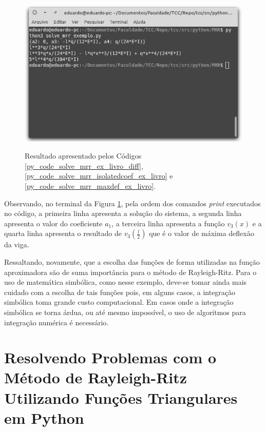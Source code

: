 \documentclass[
	12pt,				%
	openright,			%
    twoside,			%
	a4paper,			%
	english,			%
	french,				%
	spanish,			%
	brazil				%
	]{abntex2}
\numberwithin{lema}{chapter}
\numberwithin{teorema}{chapter}
\numberwithin{definicao}{chapter}
\numberwithin{exemplo}{chapter}
\numberwithin{figure}{chapter}
\begin{document}
\begin{figure}[h]
	\caption{Resultado apresentado pelos Códigos \ref{py_code_solve_mrr_ex_livro_diff}, \ref{py_code_solve_mrr_isolatedcoef_ex_livro} e \ref{py_code_solve_mrr_maxdef_ex_livro}.}
	\centering
	\includegraphics[scale=2.5]{../figuras/code/code_solve_mrr_exec_complete.png}
	\label{fig:code_solve_mrr_exec_complete}
\end{figure}

Observando, no terminal da Figura \ref{fig:code_solve_mrr_exec_complete}, pela ordem dos comandos \textit{print} executados no código, a primeira linha apresenta a solução do sistema, a segunda linha apresenta o valor do coeficiente $a_1$, a terceira linha apresenta a função $v_3(x)$ e a quarta linha apresenta o resultado de $v_3(\frac{l}{2})$ que é o valor de máxima deflexão da viga.

Ressaltando, novamente, que a escolha das funções de forma utilizadas na função aproximadora são de suma importância para o método de Rayleigh-Ritz. Para o uso de matemática simbólica, como nesse exemplo, deve-se tomar ainda mais cuidado com a escolha de tais funções pois, em alguns casos, a integração simbólica toma grande custo computacional. Em casos onde a integração simbólica se torna árdua, ou até mesmo impossível, o uso de algoritmos para integração numérica é necessário.

\section{Resolvendo Problemas com o Método de Rayleigh-Ritz Utilizando Funções Triangulares em Python}
\label{sec:python_triangular}
\end{document}
